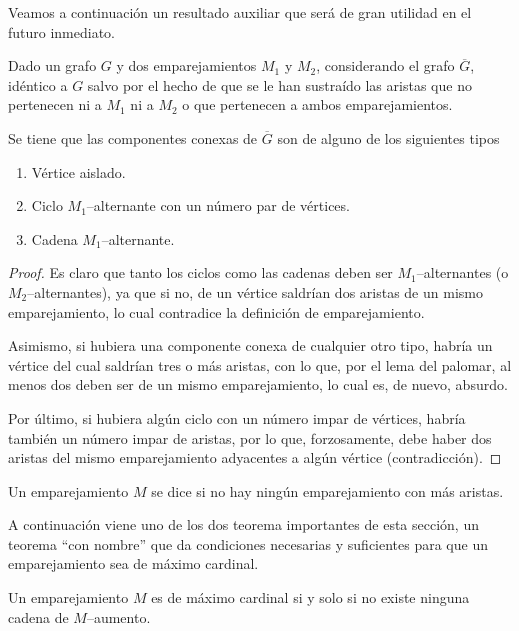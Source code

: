 Veamos a continuación un resultado auxiliar que será de gran utilidad en el futuro inmediato.
\begin{lem}\label{asig_lem_compon}
	Dado un grafo $G$ y dos emparejamientos $M_1$ y $M_2$, considerando el grafo $\overline{G}$, idéntico a $G$ salvo por el hecho de que se le han sustraído las aristas que no pertenecen ni a $M_1$ ni a $M_2$ o que pertenecen a ambos emparejamientos.
	
	Se tiene que las componentes conexas de $\overline{G}$ son de alguno de los siguientes tipos
	\begin{enumerate}
		\item Vértice aislado.
		\item Ciclo $M_1$--alternante con un número par de vértices.
		\item Cadena $M_1$--alternante.
	\end{enumerate}
\end{lem}
\begin{proof}
	Es claro que tanto los ciclos como las cadenas deben ser $M_1$--alternantes (o $M_2$--alternantes), ya que si no, de un vértice saldrían dos aristas de un mismo emparejamiento, lo cual contradice la definición de emparejamiento.
	
	Asimismo, si hubiera una componente conexa de cualquier otro tipo, habría un vértice del cual saldrían tres o más aristas, con lo que, por el lema del palomar, al menos dos deben ser de un mismo emparejamiento, lo cual es, de nuevo, absurdo.
	
	Por último, si hubiera algún ciclo con un número impar de vértices, habría también un número impar de aristas, por lo que, forzosamente, debe haber dos aristas del mismo emparejamiento adyacentes a algún vértice (contradicción).
\end{proof}
\begin{defi}
	Un emparejamiento $M$ se dice  si no hay ningún emparejamiento con más aristas.
\end{defi}
A continuación viene uno de los dos teorema importantes de esta sección, un teorema ``con nombre'' que da condiciones necesarias y suficientes para que un emparejamiento sea de máximo cardinal.
\begin{theo}
	Un emparejamiento $M$ es de máximo cardinal si y solo si no existe ninguna cadena de $M$--aumento.
\end{theo}
